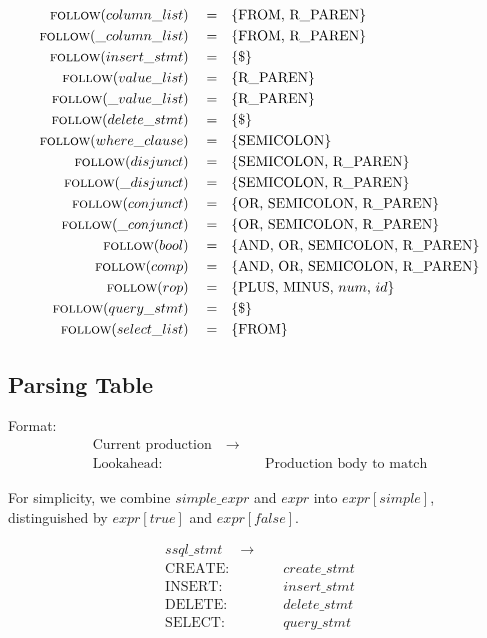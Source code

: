 \documentclass{article}
\begin{document}
\begin{align*}
\textsc{follow}(column\_list)\quad =& \quad \{\text{FROM, R\_PAREN}\} \\
\textsc{follow}(\_column\_list)\quad =& \quad \{\text{FROM, R\_PAREN}\} \\
\textsc{follow}(insert\_stmt)\quad =& \quad \{\text{\$}\} \\
\textsc{follow}(value\_list)\quad =& \quad \{\text{R\_PAREN}\} \\
\textsc{follow}(\_value\_list)\quad =& \quad \{\text{R\_PAREN}\} \\
\textsc{follow}(delete\_stmt)\quad =& \quad \{\text{\$}\} \\
\textsc{follow}(where\_clause)\quad =& \quad \{\text{SEMICOLON}\} \\
\textsc{follow}(disjunct)\quad =& \quad \{\text{SEMICOLON, R\_PAREN}\} \\
\textsc{follow}(\_disjunct)\quad =& \quad \{\text{SEMICOLON, R\_PAREN}\} \\
\textsc{follow}(conjunct)\quad =& \quad \{\text{OR, SEMICOLON, R\_PAREN}\} \\
\textsc{follow}(\_conjunct)\quad =& \quad \{\text{OR, SEMICOLON, R\_PAREN}\} \\
\textsc{follow}(bool)\quad =& \quad \{\text{AND, OR, SEMICOLON, R\_PAREN}\} \\
\textsc{follow}(comp)\quad =& \quad \{\text{AND, OR, SEMICOLON, R\_PAREN}\} \\
\textsc{follow}(rop)\quad =& \quad \{\text{PLUS, MINUS, }num \text{, } id\} \\
\textsc{follow}(query\_stmt)\quad =& \quad \{\text{\$}\} \\
\textsc{follow}(select\_list)\quad =& \quad \{\text{FROM}\} 
\end{align*}
\subsection{Parsing Table}

Format:
\begin{align*}
\text{Current production} \quad  \to & \quad\\
\text{Lookahead}: & \quad \text{Production body to match}
\end{align*}

For simplicity, we combine $simple\_expr$ and $expr$ into $expr[simple]$, distinguished by $expr[true]$ and $expr[false]$.

\begin{align*}
ssql\_stmt \quad  \to & \quad\\
\text{CREATE}: & \quad create\_stmt \\
\text{INSERT}: & \quad insert\_stmt \\
\text{DELETE}: &  \quad delete\_stmt \\
\text{SELECT}: & \quad query\_stmt
\end{align*}
\end{document}
